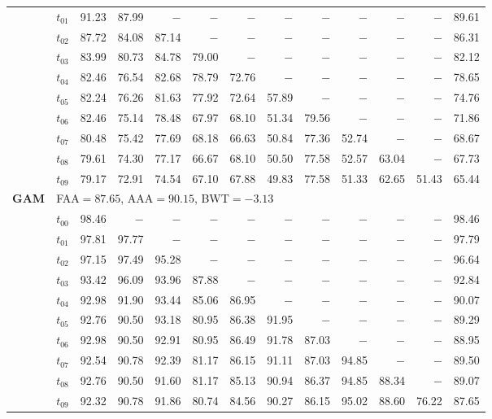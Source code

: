 \begin{table}[ht]
\begin{tabular}{@{}l l r r r r r r r r r r r@{}}
 & $t_{01}$ & 91.23 & 87.99 & $-$ & $-$ & $-$ & $-$ & $-$ & $-$ & $-$ & $-$ & 89.61 \\
 & $t_{02}$ & 87.72 & 84.08 & 87.14 & $-$ & $-$ & $-$ & $-$ & $-$ & $-$ & $-$ & 86.31 \\
 & $t_{03}$ & 83.99 & 80.73 & 84.78 & 79.00 & $-$ & $-$ & $-$ & $-$ & $-$ & $-$ & 82.12 \\
 & $t_{04}$ & 82.46 & 76.54 & 82.68 & 78.79 & 72.76 & $-$ & $-$ & $-$ & $-$ & $-$ & 78.65 \\
 & $t_{05}$ & 82.24 & 76.26 & 81.63 & 77.92 & 72.64 & 57.89 & $-$ & $-$ & $-$ & $-$ & 74.76 \\
 & $t_{06}$ & 82.46 & 75.14 & 78.48 & 67.97 & 68.10 & 51.34 & 79.56 & $-$ & $-$ & $-$ & 71.86 \\
 & $t_{07}$ & 80.48 & 75.42 & 77.69 & 68.18 & 66.63 & 50.84 & 77.36 & 52.74 & $-$ & $-$ & 68.67 \\
 & $t_{08}$ & 79.61 & 74.30 & 77.17 & 66.67 & 68.10 & 50.50 & 77.58 & 52.57 & 63.04 & $-$ & 67.73 \\
 & $t_{09}$ & 79.17 & 72.91 & 74.54 & 67.10 & 67.88 & 49.83 & 77.58 & 51.33 & 62.65 & 51.43 & 65.44 \\
\midrule
\multirow{11}{*}{\textbf{GAM}} & \multicolumn{12}{l}{\quad\small FAA$=87.65$,\; AAA$=90.15$,\; BWT$=-3.13$} \\
 & $t_{00}$ & 98.46 & $-$ & $-$ & $-$ & $-$ & $-$ & $-$ & $-$ & $-$ & $-$ & 98.46 \\
 & $t_{01}$ & 97.81 & 97.77 & $-$ & $-$ & $-$ & $-$ & $-$ & $-$ & $-$ & $-$ & 97.79 \\
 & $t_{02}$ & 97.15 & 97.49 & 95.28 & $-$ & $-$ & $-$ & $-$ & $-$ & $-$ & $-$ & 96.64 \\
 & $t_{03}$ & 93.42 & 96.09 & 93.96 & 87.88 & $-$ & $-$ & $-$ & $-$ & $-$ & $-$ & 92.84 \\
 & $t_{04}$ & 92.98 & 91.90 & 93.44 & 85.06 & 86.95 & $-$ & $-$ & $-$ & $-$ & $-$ & 90.07 \\
 & $t_{05}$ & 92.76 & 90.50 & 93.18 & 80.95 & 86.38 & 91.95 & $-$ & $-$ & $-$ & $-$ & 89.29 \\
 & $t_{06}$ & 92.98 & 90.50 & 92.91 & 80.95 & 86.49 & 91.78 & 87.03 & $-$ & $-$ & $-$ & 88.95 \\
 & $t_{07}$ & 92.54 & 90.78 & 92.39 & 81.17 & 86.15 & 91.11 & 87.03 & 94.85 & $-$ & $-$ & 89.50 \\
 & $t_{08}$ & 92.76 & 90.50 & 91.60 & 81.17 & 85.13 & 90.94 & 86.37 & 94.85 & 88.34 & $-$ & 89.07 \\
 & $t_{09}$ & 92.32 & 90.78 & 91.86 & 80.74 & 84.56 & 90.27 & 86.15 & 95.02 & 88.60 & 76.22 & 87.65 \\

\end{tabular}
\end{table}
